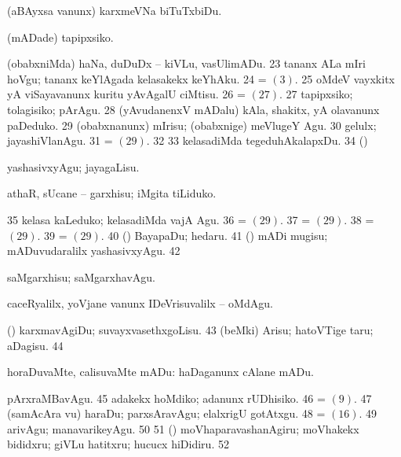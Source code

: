 { (aBAyxsa \mo vanunx) karxmeVNa biTuTxbiDu. 

 (mADade) tapipxsiko.

 (obabxniMda) haNa, duDuDx -- kiVLu, vasUlimADu. 
\num{23}  tananx ALa mIri hoVgu; tananx keYlAgada kelasakekx keYhAku.
\num{24}  = \hyperlink{get nuga3}{\nuga$(3)$}. 
\num{25}  oMdeV vayxkitx yA
viSayavanunx kuritu yAvAgalU ciMtisu.
\num{26}  = \hyperlink{get nuga27}{\nuga $(27)$}.
\hypertarget{get nuga27}{}
\num{27}  tapipxsiko; tolagisiko; 
pArAgu. 
\num{28}  (yAvudanenxV mADalu) kAla, shakitx, yA
olavanunx paDeduko. 
\hypertarget{get nuga29}{}
\num{29}  (obabxnanunx)
mIrisu; (obabxnige) meVlugeY Agu. 
\num{30}  gelulx; jayashiVlanAgu. 
\num{31}  =  \hyperlink{get nuga29}{\nuga $(29)$}.
\num{32}  
\num{33}  kelasadiMda tegeduhAkalapxDu. 
\num{34}  (\ashi) 

 yashasivxyAgu; jayagaLisu. 

 athaR, sUcane -- garxhisu; iMgita tiLiduko. 

\num{35}  kelasa kaLeduko; kelasadiMda vajA Agu. 
\num{36}  = \hyperlink{get nuga29}{\nuga $(29)$}. 
\num{37}  = \hyperlink{get nuga29}{\nuga $(29)$}. 
\num{38}  = \hyperlink{get nuga29}{\nuga $(29)$}.
\num{39}  = \hyperlink{get nuga29}{\nuga$(29)$}.
\num{40}  (\ashi) BayapaDu; hedaru. 
\num{41}  (\ame) mADi mugisu; mADuvudaralilx yashasivxyAgu. 
\num{42}  

 saMgarxhisu; saMgarxhavAgu. 

 caceRyalilx, yoVjane \mo vanunx IDeVrisuvalilx -- oMdAgu. 

 (\ashi) karxmavAgiDu; suvayxvasethxgoLisu.
\num{43}  (beMki) Arisu; hatoVTige taru; aDagisu. 
\num{44}  

 horaDuvaMte, calisuvaMte mADu:  haDaganunx cAlane mADu. 

 pArxraMBavAgu. 
\num{45}  adakekx hoMdiko; adanunx rUDhisiko. 
\num{46}  = \hyperlink{get nuga9}{\nuga $(9)$}. 
\num{47}  (samAcAra \mo vu) haraDu; parxsAravAgu;
elalxrigU gotAtxgu. 
\num{48}  = \hyperlink{get nuga16}{\nuga $(16)$}. 
\num{49}  arivAgu; manavarikeyAgu. 
\num{50}  
\num{51}  (\ashi)
moVhaparavashanAgiru; moVhakekx bididxru; giVLu hatitxru; hucucx hiDidiru.
\num{52}  

}
